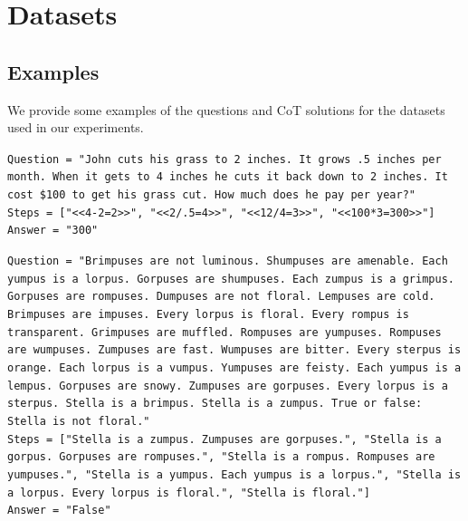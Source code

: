 \documentclass[]{fairmeta}
\begin{document}



\clearpage
\newpage
\beginappendix
\section{Datasets}
\label{sec:dataset-appendix}

\subsection{Examples}
We provide some examples of the questions and CoT solutions for the datasets used in our experiments.

\begin{tcolorbox}[title=GSM8k, colback=white]
\texttt{Question = "John cuts his grass to 2 inches.  It grows .5 inches per month.  When it gets to 4 inches he cuts it back down to 2 inches.  It cost \$100 to get his grass cut.  How much does he pay per year?" \\ Steps = ["<<4-2=2>>", "<<2/.5=4>>", "<<12/4=3>>", "<<100*3=300>>"]\\
Answer = "300"
}
\end{tcolorbox}



\begin{tcolorbox}[title=ProntoQA, colback=white]
\texttt{Question = "Brimpuses are not luminous. Shumpuses are amenable. Each yumpus is a lorpus. Gorpuses are shumpuses. Each zumpus is a grimpus. Gorpuses are rompuses. Dumpuses are not floral. Lempuses are cold. Brimpuses are impuses. Every lorpus is floral. Every rompus is transparent. Grimpuses are muffled. Rompuses are yumpuses. Rompuses are wumpuses. Zumpuses are fast. Wumpuses are bitter. Every sterpus is orange. Each lorpus is a vumpus. Yumpuses are feisty. Each yumpus is a lempus. Gorpuses are snowy. Zumpuses are gorpuses. Every lorpus is a sterpus. Stella is a brimpus. Stella is a zumpus. True or false: Stella is not floral." \\ Steps = ["Stella is a zumpus. Zumpuses are gorpuses.", "Stella is a gorpus. Gorpuses are rompuses.", "Stella is a rompus. Rompuses are yumpuses.", "Stella is a yumpus. Each yumpus is a lorpus.", "Stella is a lorpus. Every lorpus is floral.", "Stella is floral."]\\
Answer = "False"
}
\end{tcolorbox}
\end{document}
